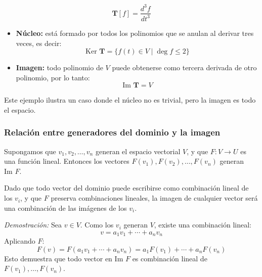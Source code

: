 \[
\mathbf{T}[f] = \frac{d^3 f}{dt^3}
\]

\begin{itemize}
  \item \textbf{Núcleo:} está formado por todos los polinomios que se anulan al derivar tres veces, es decir:
  \[
  \text{Ker } \mathbf{T} = \{f(t) \in V \mid \deg f \leq 2\}
  \]
  \item \textbf{Imagen:} todo polinomio de \(V\) puede obtenerse como tercera derivada de otro polinomio, por lo tanto:
  \[
  \text{Im } \mathbf{T} = V
  \]
\end{itemize}

Este ejemplo ilustra un caso donde el núcleo no es trivial, pero la imagen es todo el espacio.

\subsubsection{Relación entre generadores del dominio y la imagen}

Supongamos que \(v_1, v_2, \dots, v_n\) generan el espacio vectorial \(V\), y que \(F:V \rightarrow U\) es una función lineal. Entonces los vectores \(F(v_1), F(v_2), \dots, F(v_n)\) generan \(\text{Im } F\).

\begin{tcolorbox}[title=Idea intuitiva]
Dado que todo vector del dominio puede escribirse como combinación lineal de los \(v_i\), y que \(F\) preserva combinaciones lineales, la imagen de cualquier vector será una combinación de las imágenes de los \(v_i\).
\end{tcolorbox}

\textit{Demostración:} Sea \(v \in V\). Como los \(v_i\) generan \(V\), existe una combinación lineal:
\[
v = a_1 v_1 + \cdots + a_n v_n
\]
Aplicando \(F\):
\[
F(v) = F(a_1 v_1 + \cdots + a_n v_n) = a_1 F(v_1) + \cdots + a_n F(v_n)
\]
Esto demuestra que todo vector en \(\text{Im } F\) es combinación lineal de \(F(v_1), \dots, F(v_n)\).
